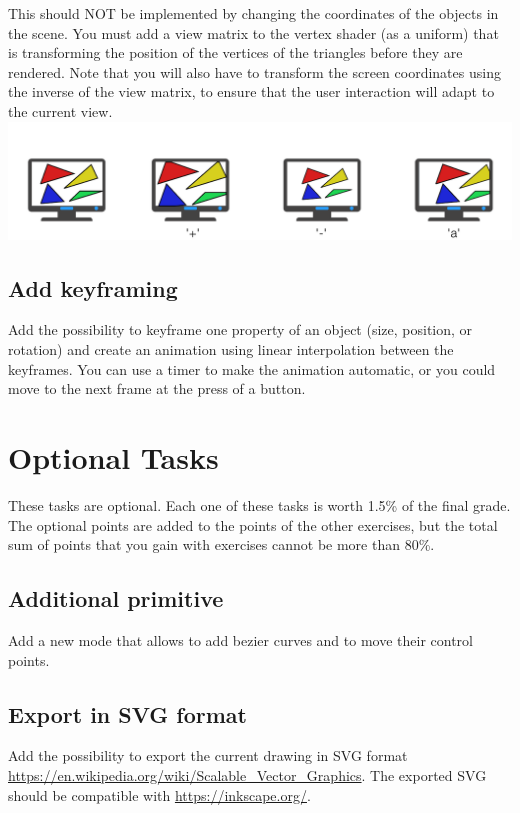 \documentclass[11pt]{article}
\begin{document}
This should NOT be implemented by changing the coordinates of the objects in the scene. You must add a view matrix to the vertex shader (as a uniform) that is transforming the position of the vertices of the triangles before they are rendered. Note that you will also have to transform the screen coordinates using the inverse of the view matrix, to ensure that the user interaction will adapt to the current view.
\includegraphics[width=1\textwidth]{view.pdf}

\subsection{Add keyframing}

Add the possibility to keyframe one property of an object (size,  position, or rotation) and create an animation using linear interpolation between the keyframes. You can use a timer to make the animation automatic, or you could move to the next frame at the press of a button.

\section*{Optional Tasks}

These tasks are optional. Each one of these tasks is worth 1.5\% of the final grade. The optional points are added to the points of the other exercises, but the total sum of points that you gain with exercises cannot be more than 80\%.

\subsection{Additional primitive}

Add a new mode that allows to add bezier curves and to move their control points.

\subsection{Export in SVG format}

Add the possibility to export the current drawing in SVG format \url{https://en.wikipedia.org/wiki/Scalable_Vector_Graphics}. The exported SVG should be compatible with \url{https://inkscape.org/}.
\end{document}
